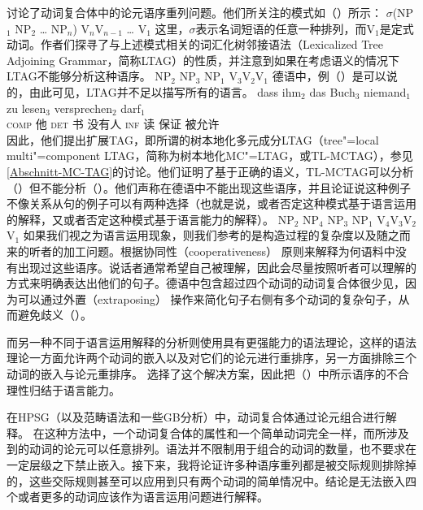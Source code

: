  \citet{JBR2000a}讨论了动词复合体中的论元语序重列问题。他们所关注的模式如（）所示：
\ea
$\sigma$(NP$_1$ NP$_2$ \ldots{} NP$_n$) V$_{n}$V$_{n-1}$ \ldots{} V$_{1}$
\z
这里，$\sigma$表示名词短语的任意一种排列，而V$_{1}$是定式动词。作者们探寻了与上述模式相关的词汇化树邻接语法（Lexicalized Tree Adjoining Grammar，简称LTAG）的性质，并注意到如果在考虑语义的情况下LTAG不能够分析这种语序。
\ea
NP$_2$ NP$_3$ NP$_1$ V$_{3}$V$_{2}$V$_{1}$
\z
德语中，例（）是可以说的，由此可见，LTAG并不足以描写所有的语言。
\ea
\gll dass ihm$_2$ das Buch$_3$ niemand$_1$ zu lesen$_3$ versprechen$_2$ darf$_1$\\
     \textsc{comp} 他     \textsc{det} 书 没有人 \textsc{inf} 读 保证 被允许 \\
\z
因此，他们提出扩展TAG，即所谓的树本地化多元成分LTAG（tree"=local multi"=component LTAG，简称为树本地化MC"=LTAG，或TL-MCTAG），参见\ref{Abschnitt-MC-TAG}的讨论。他们证明了基于正确的语义，TL-MCTAG可以分析（）但不能分析（）。他们声称在德语中不能出现这些语序，并且论证说这种例子不像关系从句的例子可以有两种选择（也就是说，或者否定这种模式基于语言运用的解释，又或者否定这种模式基于语言能力的解释）。
\ea
\label{ex-mc-ltag-fails}
NP$_2$ NP$_4$ NP$_3$ NP$_1$ V$_{4}$V$_{3}$V$_{2}$V$_{1}$
\z
如果我们视之为语言运用现象，则我们参考的是构造过程的复杂度以及随之而来的听者的加工问题。根据协同性（cooperativeness）
原则来解释为何语料中没有出现过这些语序。说话者通常希望自己被理解，因此会尽量按照听者可以理解的方式来明确表达出他们的句子。德语中包含超过四个动词的动词复合体很少见，因为可以通过外置（extraposing）
操作来简化句子右侧有多个动词的复杂句子，从而避免歧义（\citealp[]{MuellerLehrbuch1}）。

而另一种不同于语言运用解释的分析则使用具有更强能力的语法理论，这样的语法理论一方面允许两个动词的嵌入以及对它们的论元进行重排序，另一方面排除三个动词的嵌入与论元重排序。 \citet{JBR2000a}选择了这个解决方案，因此把（）中所示语序的不合理性归结于语言能力。 

在HPSG（以及范畴语法\indexcgc 和一些GB分析\indexgbc）中，动词复合体通过论元组合进行解释\citep{HN89b,HN94a}。 在这种方法中，一个动词复合体的属性和一个简单动词完全一样，而所涉及到的动词的论元可以任意排列。语法并不限制用于组合的动词的数量，也不要求在一定层级之下禁止嵌入。接下来，我将论证许多种语序重列都是被交际规则排除掉的，这些交际规则甚至可以应用到只有两个动词的简单情况中。结论是无法嵌入四个或者更多的动词应该作为语言运用问题进行解释。


